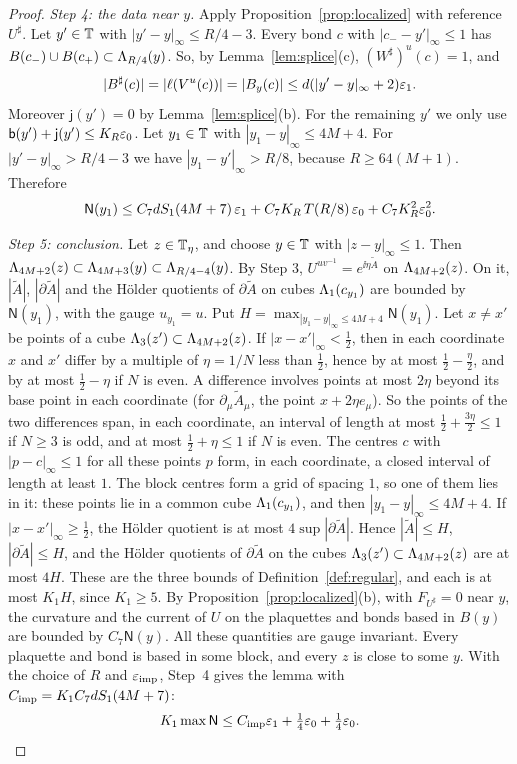 \begin{proof}
\emph{Step 4: the data near $y$.} Apply Proposition~\ref{prop:localized} with reference $U^\sharp$. Let $y'\in\mathbb T$ with $|y'-y|_\infty\le R/4-3$. Every bond $c$ with $|c_--y'|_\infty\le1$ has $B(c_-)\cup B(c_+)\subset\Lambda_{R/4}(y)$. So, by Lemma~\ref{lem:splice}(c), $(W^\sharp)^u(c)=1$, and
\[
|B^\sharp(c)|=|\ell(V^u(c))|=|B_y(c)|\le d(|y'-y|_\infty+2)\varepsilon_1 .
\]
Moreover $\mathsf j(y')=0$ by Lemma~\ref{lem:splice}(b). For the remaining $y'$ we only use $\mathsf b(y')+\mathsf j(y')\le K_R\varepsilon_0$. Let $y_1\in\mathbb T$ with $|y_1-y|_\infty\le4M+4$. For $|y'-y|_\infty>R/4-3$ we have $|y_1-y'|_\infty>R/8$, because $R\ge64(M+1)$. Therefore
\[
\mathsf N(y_1)\le C_7dS_1(4M+7)\,\varepsilon_1+C_7K_R\,T(R/8)\,\varepsilon_0+C_7K_R^2\varepsilon_0^2 .
\]

\emph{Step 5: conclusion.} Let $z\in\mathbb T_\eta$, and choose $y\in\mathbb T$ with $|z-y|_\infty\le1$. Then $\Lambda_{4M+2}(z)\subset\Lambda_{4M+3}(y)\subset\Lambda_{R/4-4}(y)$. By Step 3, $U^{uv^{-1}}=e^{\ii\eta\tilde A}$ on $\Lambda_{4M+2}(z)$. On it, $|\tilde A|$, $|\partial\tilde A|$ and the H\"older quotients of $\partial\tilde A$ on cubes $\Lambda_1(c_{y_1})$ are bounded by $\mathsf N(y_1)$, with the gauge $u_{y_1}=u$. Put $H=\max_{|y_1-y|_\infty\le4M+4}\mathsf N(y_1)$. Let $x\ne x'$ be points of a cube $\Lambda_3(z')\subset\Lambda_{4M+2}(z)$. If $|x-x'|_\infty<\frac12$, then in each coordinate $x$ and $x'$ differ by a multiple of $\eta=1/N$ less than $\frac12$, hence by at most $\frac12-\frac\eta2$, and by at most $\frac12-\eta$ if $N$ is even. A difference involves points at most $2\eta$ beyond its base point in each coordinate (for $\partial_\mu\tilde A_\mu$, the point $x+2\eta e_\mu$). So the points of the two differences span, in each coordinate, an interval of length at most $\frac12+\frac{3\eta}2\le1$ if $N\ge3$ is odd, and at most $\frac12+\eta\le1$ if $N$ is even. The centres $c$ with $|p-c|_\infty\le1$ for all these points $p$ form, in each coordinate, a closed interval of length at least $1$. The block centres form a grid of spacing $1$, so one of them lies in it: these points lie in a common cube $\Lambda_1(c_{y_1})$, and then $|y_1-y|_\infty\le4M+4$. If $|x-x'|_\infty\ge\frac12$, the H\"older quotient is at most $4\sup|\partial\tilde A|$. Hence $|\tilde A|\le H$, $|\partial\tilde A|\le H$, and the H\"older quotients of $\partial\tilde A$ on the cubes $\Lambda_3(z')\subset\Lambda_{4M+2}(z)$ are at most $4H$. These are the three bounds of Definition~\ref{def:regular}, and each is at most $K_1H$, since $K_1\ge5$. By Proposition~\ref{prop:localized}(b), with $F_{U^\sharp}=0$ near $y$, the curvature and the current of $U$ on the plaquettes and bonds based in $B(y)$ are bounded by $C_7\mathsf N(y)$. All these quantities are gauge invariant. Every plaquette and bond is based in some block, and every $z$ is close to some $y$. With the choice of $R$ and $\varepsilon_{\rm imp}$, Step~4 gives the lemma with $C_{\rm imp}=K_1C_7dS_1(4M+7)$:
\[
K_1\max\mathsf N\le C_{\rm imp}\varepsilon_1+\tfrac14\varepsilon_0+\tfrac14\varepsilon_0 .\qedhere
\]
\end{proof}

